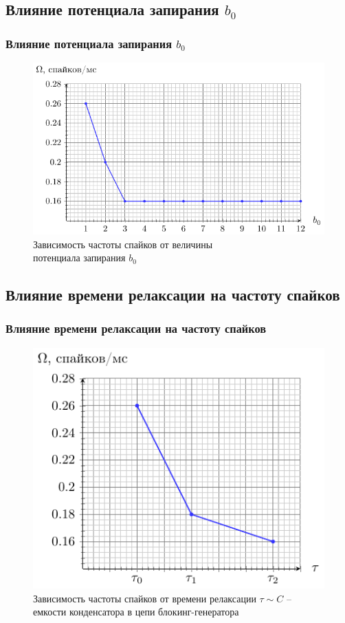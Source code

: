 \subsection{Влияние потенциала запирания $b_0$}
\begin{frame}%
	\frametitle{Влияние потенциала запирания $b_0$}
	\begin{figure}[h]
		\includegraphics[]{img/b0}
		\caption{Зависимость частоты спайков от величины \\потенциала запирания $b_0$ }
	\end{figure}
\end{frame}
\subsection{Влияние времени релаксации на частоту спайков}
\begin{frame}%
	\frametitle{Влияние времени релаксации на частоту спайков}
	\begin{figure}[h]
		\includegraphics[]{img/ntau2}
		\caption{Зависимость частоты спайков от времени релаксации $\tau \sim C$ -- емкости конденсатора в цепи блокинг-генератора}  
	\end{figure} 
\end{frame}

